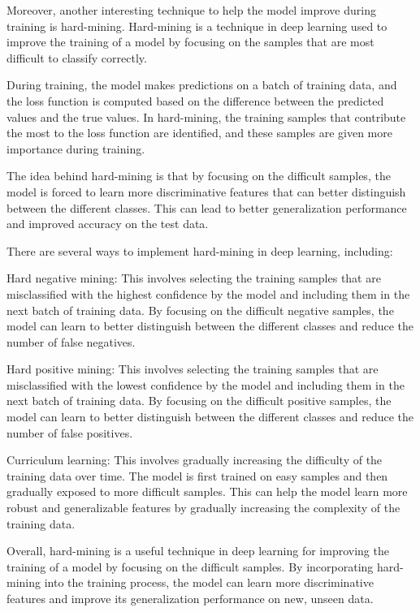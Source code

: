 Moreover, another interesting technique to help the model improve during training is hard-mining. Hard-mining is a technique in deep learning used to improve the training of a model by focusing on the samples that are most difficult to classify correctly.

During training, the model makes predictions on a batch of training data, and the loss function is computed based on the difference between the predicted values and the true values. In hard-mining, the training samples that contribute the most to the loss function are identified, and these samples are given more importance during training.

The idea behind hard-mining is that by focusing on the difficult samples, the model is forced to learn more discriminative features that can better distinguish between the different classes. This can lead to better generalization performance and improved accuracy on the test data.

There are several ways to implement hard-mining in deep learning, including:

Hard negative mining: This involves selecting the training samples that are misclassified with the highest confidence by the model and including them in the next batch of training data. By focusing on the difficult negative samples, the model can learn to better distinguish between the different classes and reduce the number of false negatives.

Hard positive mining: This involves selecting the training samples that are misclassified with the lowest confidence by the model and including them in the next batch of training data. By focusing on the difficult positive samples, the model can learn to better distinguish between the different classes and reduce the number of false positives.

Curriculum learning: This involves gradually increasing the difficulty of the training data over time. The model is first trained on easy samples and then gradually exposed to more difficult samples. This can help the model learn more robust and generalizable features by gradually increasing the complexity of the training data.

Overall, hard-mining is a useful technique in deep learning for improving the training of a model by focusing on the difficult samples. By incorporating hard-mining into the training process, the model can learn more discriminative features and improve its generalization performance on new, unseen data.